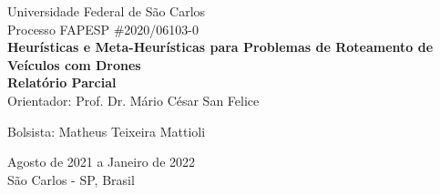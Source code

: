 \documentclass[12pt, a4paper]{article}
\begin{document}
\begin{titlepage}
	\begin{center}
    	\large{Universidade Federal de São Carlos}\\
    	\vspace{65pt}
    	\vspace{35pt}
    	\large{Processo FAPESP \#2020/06103-0}\\ 
        \vspace{95pt}
        \textbf{\LARGE{Heurísticas e Meta-Heurísticas para Problemas de Roteamento de Veículos com Drones}}\\
        \vspace{0,5cm}
        \textbf{Relatório Parcial}\\
        \vspace{2,5cm}
        Orientador: Prof. Dr. Mário César San Felice
            
        Bolsista: Matheus Teixeira Mattioli
    	\vspace{2,5cm}
	\end{center}
	
	\begin{flushleft}
		\begin{tabbing}
			
	\end{tabbing}
 \end{flushleft}
	\vspace{1cm}
	
	\begin{center}
		\vspace{\fill}
		 Agosto de 2021 a Janeiro de 2022\\
		 São Carlos - SP, Brasil
			\end{center}
\end{titlepage}

\newpage
\tableofcontents
\thispagestyle{empty}
\newpage
\end{document}
